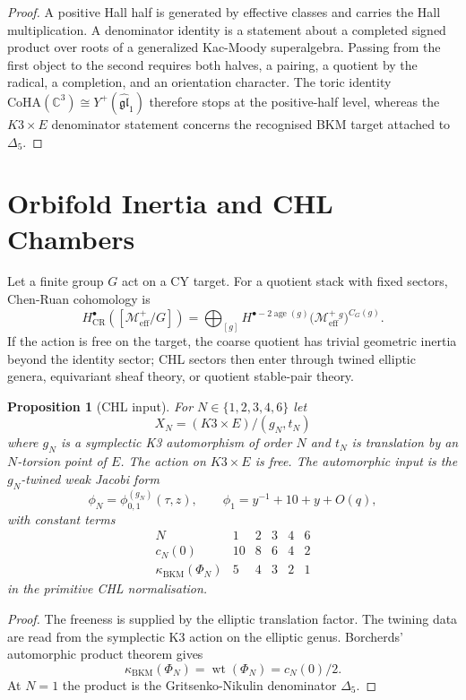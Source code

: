 \documentclass[11pt]{amsart}
\providecommand{\C}{\mathbb{C}}
\providecommand{\CoHA}{\mathrm{CoHA}}
\providecommand{\CR}{\mathrm{CR}}
\providecommand{\cM}{\mathcal{M}}
\providecommand{\kBKM}{\kappa_{\mathrm{BKM}}}
\providecommand{\Meff}{\cM^{+}_{\mathrm{eff}}}
\providecommand{\Yph}{Y^{+}(\widehat{\mathfrak{gl}}_1)}
\theoremstyle{plain}
\newtheorem{proposition}[theorem]{Proposition}
\theoremstyle{definition}
\theoremstyle{remark}
\begin{document}
\begin{proof}
A positive Hall half is generated by effective classes and carries the
Hall multiplication. A denominator identity is a statement about a
completed signed product over roots of a generalized Kac-Moody
superalgebra. Passing from the first object to the second requires both
halves, a pairing, a quotient by the radical, a completion, and an
orientation character. The toric identity
$\CoHA(\C^3)\cong\Yph$ therefore stops at the positive-half level,
whereas the $K3\times E$ denominator statement concerns the recognised
BKM target attached to $\Delta_5$.
\end{proof}

\section{Orbifold Inertia and CHL Chambers}

Let a finite group $G$ act on a CY target. For a quotient stack with
fixed sectors, Chen-Ruan cohomology is
\[
 H^\bullet_{\CR}([\Meff/G])
 =
 \bigoplus_{[g]}
 H^{\bullet-2\operatorname{age}(g)}
 \bigl(\Meff^g\bigr)^{C_G(g)} .
\]
If the action is free on the target, the coarse quotient has trivial
geometric inertia beyond the identity sector; CHL sectors then enter
through twined elliptic genera, equivariant sheaf theory, or quotient
stable-pair theory.

\begin{proposition}[CHL input]\label{prop:chl-input}
For $N\in\{1,2,3,4,6\}$ let
\[
 X_N=(K3\times E)/(g_N,t_N)
\]
where $g_N$ is a symplectic K3 automorphism of order $N$ and $t_N$ is
translation by an $N$-torsion point of $E$. The action on $K3\times E$
is free. The automorphic input is the $g_N$-twined weak Jacobi form
\[
 \phi_N=\phi^{(g_N)}_{0,1}(\tau,z),\qquad
 \phi_1=y^{-1}+10+y+O(q),
\]
with constant terms
\[
\begin{array}{c|ccccc}
N & 1 & 2 & 3 & 4 & 6\\
\hline
c_N(0) & 10 & 8 & 6 & 4 & 2\\
\kBKM(\Phi_N) & 5 & 4 & 3 & 2 & 1
\end{array}
\]
in the primitive CHL normalisation.
\end{proposition}

\begin{proof}
The freeness is supplied by the elliptic translation factor. The
twining data are read from the symplectic K3 action on the elliptic
genus. Borcherds' automorphic product theorem gives
\[
 \kBKM(\Phi_N)=\operatorname{wt}(\Phi_N)=c_N(0)/2 .
\]
At $N=1$ the product is the Gritsenko-Nikulin denominator $\Delta_5$.
\end{proof}
\end{document}
